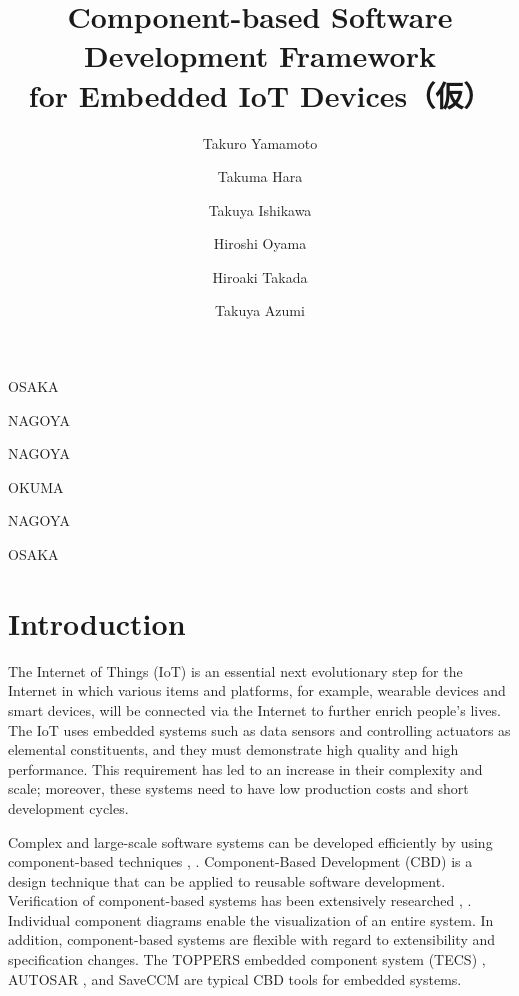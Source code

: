 \documentclass[JIP]{ipsj_v2/UTF8/ipsj}
\begin{document}
\title{Component-based Software Development Framework \\for Embedded IoT Devices（仮）}


\author{Takuro Yamamoto}{OSAKA}
\author{Takuma Hara}{NAGOYA}
\author{Takuya Ishikawa}{NAGOYA}
\author{Hiroshi Oyama}{OKUMA}
\author{Hiroaki Takada}{NAGOYA}
\author{Takuya Azumi}{OSAKA}


\begin{abstract}

\end{abstract}

\begin{keyword}

\end{keyword}

\maketitle

\section{Introduction}
\label{sec:Introduction}

The Internet of Things (IoT) is an essential next evolutionary step for the Internet \cite{par:IoTComputing} in which various items and platforms, for example, wearable devices and smart devices, will be connected via the Internet to further enrich people's lives.
The IoT uses embedded systems such as data sensors and controlling actuators as elemental constituents, and they must demonstrate high quality and high performance.
This requirement has led to an increase in their complexity and scale; moreover, these systems need to have low production costs and short development cycles.

Complex and large-scale software systems can be developed efficiently by using component-based techniques \cite{par:Crnkovic}, \cite{par:CBD}.
Component-Based Development (CBD) is a design technique that can be applied to reusable software development.
Verification of component-based systems has been extensively researched \cite{par:Blaming}, \cite{par:Verification}.
Individual component diagrams enable the visualization of an entire system.
In addition, component-based systems are flexible with regard to extensibility and specification changes.
The TOPPERS embedded component system (TECS) \cite{par:TECS}, AUTOSAR \cite{url:AUTOSAR}, and SaveCCM \cite{par:SAVEapproach} are typical CBD tools for embedded systems.
\end{document}
